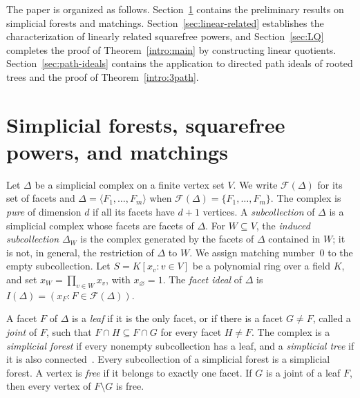 \documentclass{amsart}
\theoremstyle{definition}
\theoremstyle{remark}
\begin{document}
The paper is organized as follows. Section~\ref{sec:prelim} contains
the preliminary results on simplicial forests and matchings.
Section~\ref{sec:linear-related} establishes the characterization of
linearly related squarefree powers, and Section~\ref{sec:LQ} completes
the proof of Theorem~\ref{intro:main} by constructing linear quotients. %
Section~\ref{sec:path-ideals} contains the application to directed
path ideals of rooted trees and the proof of Theorem~\ref{intro:3path}.


\section{Simplicial forests, squarefree powers, and matchings}\label{sec:prelim}



Let $\Delta$ be a simplicial complex on a finite vertex set $V$.
We write $\mathcal F(\Delta)$ for its set of facets and
$\Delta=\langle F_1,\ldots,F_m\rangle$ when
$\mathcal F(\Delta)=\{F_1,\ldots,F_m\}$.
The complex is {\em pure} of dimension $d$ if all its facets have
$d+1$ vertices.
A {\em subcollection} of $\Delta$ is a simplicial complex whose facets
are facets of $\Delta$. For $W\subseteq V$, the {\em induced subcollection}
$\Delta_W$ is the complex generated by the facets of $\Delta$ contained
in $W$; it is not, in general, the restriction of $\Delta$ to $W$.
We assign matching number~$0$ to the empty subcollection.
Let $S=K[x_v:v\in V]$ be a polynomial ring over a field $K$, and set
$x_W=\prod_{v\in W}x_v$, with $x_{\varnothing}=1$.
The {\em facet ideal} of $\Delta$ is
$I(\Delta)=(x_F:F\in\mathcal F(\Delta))$.

A facet $F$ of $\Delta$ is a {\em leaf} if it is the only facet, or if
there is a facet $G\ne F$, called a {\em joint} of $F$, such that
$F\cap H\subseteq F\cap G$ for every facet $H\ne F$.
The complex is a {\em simplicial forest} if every nonempty subcollection
has a leaf, and a {\em simplicial tree} if it is also
connected~\cite{Faridi}.
Every subcollection of a simplicial forest is a simplicial forest.
A vertex is {\em free} if it belongs to exactly one facet.
If $G$ is a joint of a leaf $F$, then every vertex of $F\setminus G$
is free.
\end{document}
